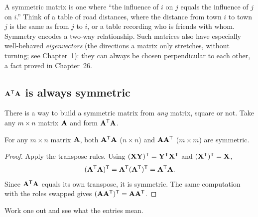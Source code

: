 \begin{intuitionbox}
A symmetric matrix is one where ``the influence of $i$ on $j$ equals the influence of $j$ on $i$.''
Think of a table of road distances, where the distance from town $i$ to town $j$ is
the same as from $j$ to $i$, or a table recording who is friends with whom. Symmetry encodes a
two-way relationship. Such matrices also have especially well-behaved \emph{eigenvectors}
(the directions a matrix only stretches, without turning; see Chapter~1): they can always be chosen
perpendicular to each other, a fact proved in Chapter~26.
\end{intuitionbox}

\subsection{\texorpdfstring{$\mathbf{A}^{\mathsf{T}}\mathbf{A}$}{ATA} is always symmetric}

There is a way to build a symmetric matrix from \emph{any} matrix, square or
not. Take any $m\times n$ matrix $\mathbf{A}$ and form $\mathbf{A}^{\mathsf{T}}\mathbf{A}$.

\begin{proposition}\label{ch10:prop-ATA}
For any $m\times n$ matrix $\mathbf{A}$, both $\mathbf{A}^{\mathsf{T}}\mathbf{A}$ ($n\times n$) and $\mathbf{A}\mathbf{A}^{\mathsf{T}}$
($m\times m$) are symmetric.
\end{proposition}

\begin{proof}
Apply the transpose rules. Using $(\mathbf{X}\mathbf{Y})^{\mathsf{T}}=\mathbf{Y}^{\mathsf{T}}\mathbf{X}^{\mathsf{T}}$ and $(\mathbf{X}^{\mathsf{T}})^{\mathsf{T}}=\mathbf{X}$,
\[
  (\mathbf{A}^{\mathsf{T}}\mathbf{A})^{\mathsf{T}}
  = \mathbf{A}^{\mathsf{T}}(\mathbf{A}^{\mathsf{T}})^{\mathsf{T}}
  = \mathbf{A}^{\mathsf{T}}\mathbf{A}.
\]
Since $\mathbf{A}^{\mathsf{T}}\mathbf{A}$ equals its own transpose, it is symmetric. The same computation with the
roles swapped gives $(\mathbf{A}\mathbf{A}^{\mathsf{T}})^{\mathsf{T}}=\mathbf{A}\mathbf{A}^{\mathsf{T}}$.
\end{proof}

Work one out and see what the entries mean.

